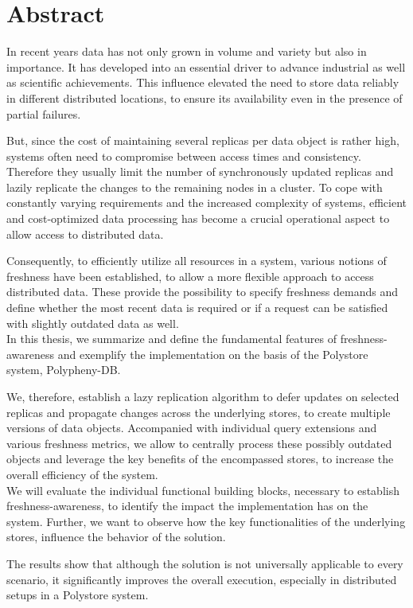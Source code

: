\chapter{Abstract}

In recent years data has not only grown in volume and variety but also in importance.
It has developed into an essential driver to advance industrial as well as scientific achievements.
This influence elevated the need to store data reliably in different distributed locations,
to ensure its availability even in the presence of partial failures.

But, since the cost of maintaining several replicas per data object
is rather high, systems often need to compromise between access times and consistency.
Therefore they usually limit the number of synchronously updated replicas and lazily replicate
the changes to the remaining nodes in a cluster.
To cope with constantly varying requirements and the increased complexity of systems,
efficient and cost-optimized data processing has become a crucial operational aspect 
to allow access to distributed data.

Consequently, to efficiently utilize all resources in a system, 
various notions of freshness have been established, to allow a more flexible approach to
access distributed data.
These provide the possibility to specify freshness demands and define whether
the most recent data is required or if a request can be satisfied with slightly outdated data as well.\\


In this thesis, we summarize and define the fundamental features of freshness-awareness and exemplify the 
implementation on the basis of the Polystore system, Polypheny-DB.

We, therefore, establish a lazy replication algorithm to defer updates on selected replicas
and propagate changes across the underlying stores, to create multiple versions of 
data objects.
Accompanied with individual query extensions and various freshness metrics, we allow to centrally process 
these possibly outdated objects and leverage the key benefits of the encompassed stores,
to increase the overall efficiency of the system.\\

We will evaluate the individual functional building blocks, necessary to establish freshness-awareness,
to identify the impact the implementation has on the system. Further, we want to observe how the
key functionalities of the underlying stores, influence the behavior of the solution.

The results show that although the solution is not 
universally applicable to every scenario, it significantly improves 
the overall execution, especially in distributed setups in a Polystore system.